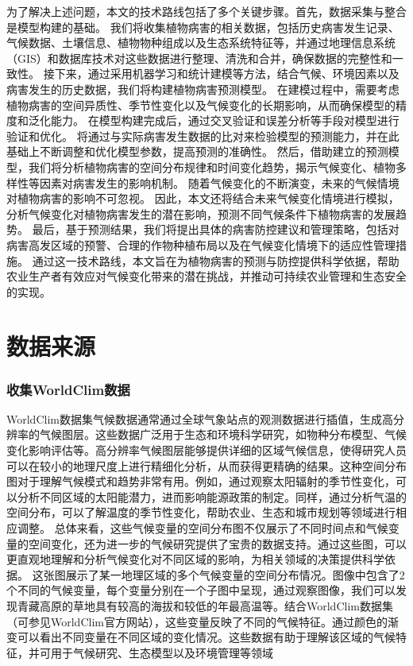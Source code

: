 \documentclass[AutoFakeBold]{LZUThesis-PgD&PhD}
\begin{document}
为了解决上述问题，本文的技术路线包括了多个关键步骤。首先，数据采集与整合是模型构建的基础。
我们将收集植物病害的相关数据，包括历史病害发生记录、气候数据、土壤信息、植物物种组成以及生态系统特征等，并通过地理信息系统（GIS）和数据库技术对这些数据进行整理、清洗和合并，确保数据的完整性和一致性。
接下来，通过采用机器学习和统计建模等方法，结合气候、环境因素以及病害发生的历史数据，我们将构建植物病害预测模型。
在建模过程中，需要考虑植物病害的空间异质性、季节性变化以及气候变化的长期影响，从而确保模型的精度和泛化能力。
在模型构建完成后，通过交叉验证和误差分析等手段对模型进行验证和优化。
将通过与实际病害发生数据的比对来检验模型的预测能力，并在此基础上不断调整和优化模型参数，提高预测的准确性。
然后，借助建立的预测模型，我们将分析植物病害的空间分布规律和时间变化趋势，揭示气候变化、植物多样性等因素对病害发生的影响机制。
随着气候变化的不断演变，未来的气候情境对植物病害的影响不可忽视。
因此，本文还将结合未来气候变化情境进行模拟，分析气候变化对植物病害发生的潜在影响，预测不同气候条件下植物病害的发展趋势。
最后，基于预测结果，我们将提出具体的病害防控建议和管理策略，包括对病害高发区域的预警、合理的作物种植布局以及在气候变化情境下的适应性管理措施。
通过这一技术路线，本文旨在为植物病害的预测与防控提供科学依据，帮助农业生产者有效应对气候变化带来的潜在挑战，并推动可持续农业管理和生态安全的实现。

\chapter{数据来源}

\subsection{收集WorldClim数据}
	
WorldClim数据集气候数据通常通过全球气象站点的观测数据进行插值，生成高分辨率的气候图层。这些数据广泛用于生态和环境科学研究，如物种分布模型、气候变化影响评估等。高分辨率气候图层能够提供详细的区域气候信息，使得研究人员可以在较小的地理尺度上进行精细化分析，从而获得更精确的结果。这种空间分布图对于理解气候模式和趋势非常有用。例如，通过观察太阳辐射的季节性变化，可以分析不同区域的太阳能潜力，进而影响能源政策的制定。同样，通过分析气温的空间分布，可以了解温度的季节性变化，帮助农业、生态和城市规划等领域进行相应调整。
总体来看，这些气候变量的空间分布图不仅展示了不同时间点和气候变量的空间变化，还为进一步的气候研究提供了宝贵的数据支持。通过这些图，可以更直观地理解和分析气候变化对不同区域的影响，为相关领域的决策提供科学依据。 这张图展示了某一地理区域的多个气候变量的空间分布情况。图像中包含了2个不同的气候变量，每个变量分别在一个子图中呈现，通过观察图像，我们可以发现青藏高原的草地具有较高的海拔和较低的年最高温等。结合WorldClim数据集（可参见WorldClim官方网站），这些变量反映了不同的气候特征。通过颜色的渐变可以看出不同变量在不同区域的变化情况。这些数据有助于理解该区域的气候特征，并可用于气候研究、生态模型以及环境管理等领域
\end{document}
